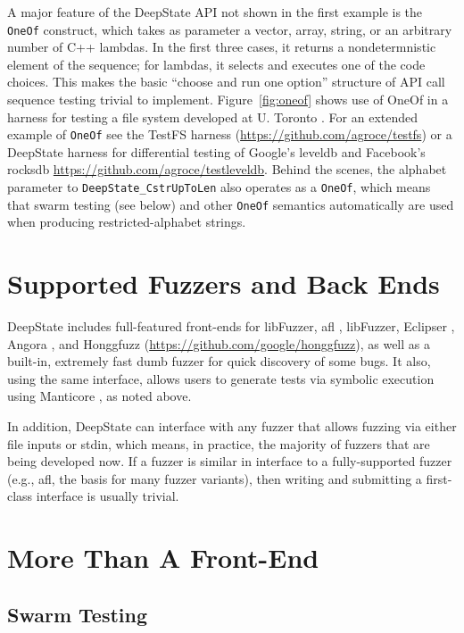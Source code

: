 \documentclass[sigconf]{acmart}
\begin{document}
A major feature of the DeepState API not shown in the first example is the {\tt OneOf} construct, which takes as parameter a vector, array, string, or an arbitrary number of C++ lambdas.  In the first three cases, it returns a nondetermnistic element of the sequence; for lambdas, it selects and executes one of the code choices.  This makes the basic ``choose and run one option'' structure of API call sequence testing trivial to implement.  Figure~\ref{fig:oneof} shows use of OneOf in a harness for testing a file system developed at U. Toronto \cite{testfs}.  For an extended example of {\tt OneOf} see the TestFS harness (\url{https://github.com/agroce/testfs}) or a DeepState harness for differential testing of Google's leveldb and Facebook's rocksdb \url{https://github.com/agroce/testleveldb}.  Behind the scenes, the alphabet parameter to {\tt DeepState\_CstrUpToLen} also operates as a {\tt OneOf}, which means that swarm testing (see below) and other {\tt OneOf} semantics automatically are used when producing restricted-alphabet strings.
  
\section{Supported Fuzzers and Back Ends}

DeepState includes full-featured front-ends for libFuzzer, afl \cite{aflfuzz}, libFuzzer, Eclipser \cite{choi:icse:2019}, Angora \cite{chen2018angora}, and Honggfuzz (\url{https://github.com/google/honggfuzz}), as well as a built-in, extremely fast dumb fuzzer for quick discovery of some bugs.  It also, using the same interface, allows users to generate tests via symbolic execution using Manticore \cite{mossberg2019manticore}, as noted above.

In addition, DeepState can interface with any fuzzer that allows fuzzing via either file inputs or stdin, which means, in practice, the majority of fuzzers that are being developed now.  If a fuzzer is similar in interface to a fully-supported fuzzer (e.g., afl, the basis for many fuzzer variants), then writing and submitting a first-class interface is usually trivial.

\section{More Than A Front-End}

\subsection{Swarm Testing}
\end{document}
